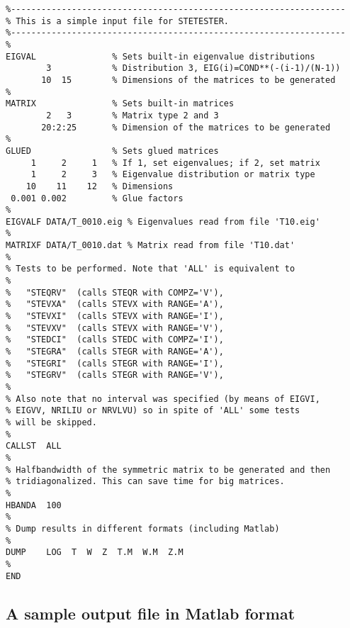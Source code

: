 \documentclass[acmtoms]{acmtrans2m}
\begin{document}
\begin{table}[htbp]
\protect \caption{A sample input file for {\tt stetester}.} 
         \label{tbl:inputfile} 
\begin{center}
\begin{minipage}[t]{4.5in}
{\small
\begin{verbatim}
%------------------------------------------------------------------
% This is a simple input file for STETESTER. 
%------------------------------------------------------------------
%
EIGVAL               % Sets built-in eigenvalue distributions
        3            % Distribution 3, EIG(i)=COND**(-(i-1)/(N-1))
       10  15        % Dimensions of the matrices to be generated
%
MATRIX               % Sets built-in matrices
        2   3        % Matrix type 2 and 3
       20:2:25       % Dimension of the matrices to be generated
%
GLUED                % Sets glued matrices
     1     2     1   % If 1, set eigenvalues; if 2, set matrix 
     1     2     3   % Eigenvalue distribution or matrix type
    10    11    12   % Dimensions
 0.001 0.002         % Glue factors
%
EIGVALF DATA/T_0010.eig % Eigenvalues read from file 'T10.eig'
%
MATRIXF DATA/T_0010.dat % Matrix read from file 'T10.dat'
%
% Tests to be performed. Note that 'ALL' is equivalent to
%
%   "STEQRV"  (calls STEQR with COMPZ='V'),
%   "STEVXA"  (calls STEVX with RANGE='A'),
%   "STEVXI"  (calls STEVX with RANGE='I'),
%   "STEVXV"  (calls STEVX with RANGE='V'),
%   "STEDCI"  (calls STEDC with COMPZ='I'),
%   "STEGRA"  (calls STEGR with RANGE='A'),
%   "STEGRI"  (calls STEGR with RANGE='I'),
%   "STEGRV"  (calls STEGR with RANGE='V'),
%
% Also note that no interval was specified (by means of EIGVI, 
% EIGVV, NRILIU or NRVLVU) so in spite of 'ALL' some tests 
% will be skipped. 
%
CALLST  ALL 
%
% Halfbandwidth of the symmetric matrix to be generated and then
% tridiagonalized. This can save time for big matrices.
%
HBANDA  100
%
% Dump results in different formats (including Matlab)
%
DUMP    LOG  T  W  Z  T.M  W.M  Z.M
%
END
\end{verbatim}
}
\end{minipage}
\end{center}
\end{table}


\subsection{A sample output file in Matlab format} 
\label{sec:sampleoutput}
\end{document}

